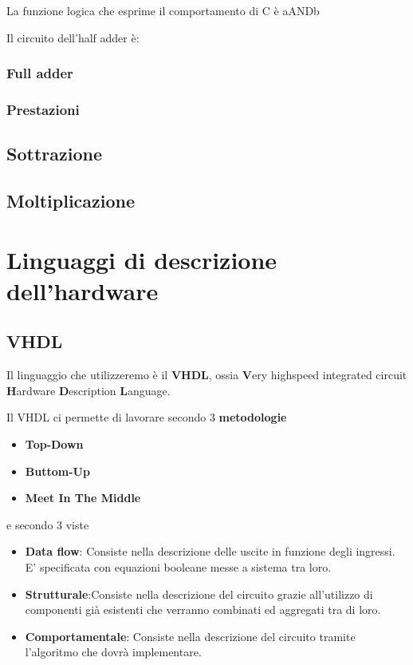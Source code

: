 \documentclass{book}
\begin{document}
La funzione logica che esprime il comportamento di C è aANDb

Il circuito dell'half adder è:


\subsection*{Full adder}




\subsection*{Prestazioni}

\section{Sottrazione}
\section{Moltiplicazione}




\chapter{Linguaggi di descrizione dell'hardware}
\section*{VHDL}

Il linguaggio che utilizzeremo è il \textbf{VHDL}, ossia \textbf{V}ery highspeed integrated circuit \textbf{H}ardware \textbf{D}escription \textbf{L}anguage.

Il VHDL ci permette di lavorare secondo 3 \textbf{metodologie}

\begin{itemize}
\item \textbf{Top-Down}
\item \textbf{Buttom-Up}
\item \textbf{Meet In The Middle}
\end{itemize}

e secondo 3 viste

\begin{itemize}
\item \textbf{Data flow}: \newline Consiste nella descrizione delle uscite in funzione degli ingressi. E' specificata con equazioni booleane messe a sistema tra loro.
\item \textbf{Strutturale}:\newline Consiste nella descrizione del circuito grazie all'utilizzo di componenti già esistenti che verranno combinati ed aggregati tra di loro. 
\item \textbf{Comportamentale}: \newline Consiste nella descrizione del circuito tramite l'algoritmo che dovrà implementare.
\end{itemize}
\end{document}
